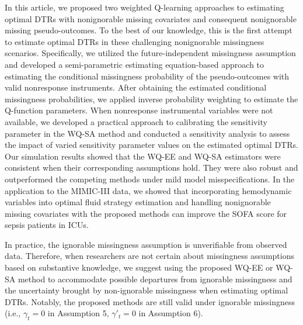 \documentclass[12pt]{article}
\begin{document}
In this article, we proposed two weighted Q-learning approaches to estimating optimal DTRs with nonignorable missing covariates and consequent nonignorable missing pseudo-outcomes. To the best of our knowledge, this is the first attempt to estimate optimal DTRs in these challenging nonignorable missingness scenarios. Specifically, we utilized the future-independent missingness assumption and developed a semi-parametric estimating equation-based approach to estimating the conditional missingness probability of the pseudo-outcomes with valid nonresponse instruments. After obtaining the estimated conditional  missingness probabilities, we applied inverse probability weighting to estimate the Q-function parameters. When nonresponse instrumental variables were not available, we developed a practical  approach to calibrating the sensitivity parameter in the WQ-SA method and conducted a sensitivity analysis to assess the impact of varied sensitivity parameter values on the estimated optimal DTRs.  
Our simulation results showed that the WQ-EE and WQ-SA estimators were consistent when their corresponding assumptions hold. They were also robust and outperformed the competing methods under mild model misspecifications. 
In the application to the MIMIC-III data,  we showed that incorporating hemodynamic variables into optimal fluid strategy estimation and handling nonignorable missing covariates with the proposed methods can improve the SOFA score for sepsis patients in ICUs.


In practice, the ignorable missingness assumption is unverifiable from observed data. Therefore, when researchers are not certain about missingness assumptions based on substantive knowledge,  we suggest using the proposed WQ-EE or WQ-SA method to accommodate possible departures from ignorable missingness and  the uncertainty brought by non-ignorable missingness when estimating optimal DTRs.  Notably, the proposed methods are still valid under ignorable missingness (i.e., $\gamma_t=0$ in Assumption 5, $\gamma'_t=0$ in Assumption 6).
\end{document}
